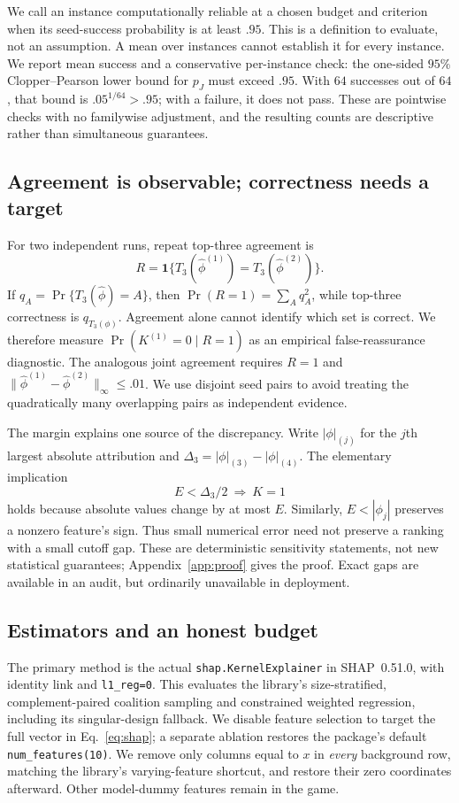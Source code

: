 We call an instance computationally reliable at a chosen budget and criterion when its seed-success probability is at least $.95$. This is a definition to evaluate, not an assumption. A mean over instances cannot establish it for every instance. We report mean success and a conservative per-instance check: the one-sided $95\%$ Clopper--Pearson lower bound for $p_J$ must exceed $.95$. With $64$ successes out of $64$, that bound is $.05^{1/64}>.95$; with a failure, it does not pass. These are pointwise checks with no familywise adjustment, and the resulting counts are descriptive rather than simultaneous guarantees.

\subsection{Agreement is observable; correctness needs a target}
For two independent runs, repeat top-three agreement is
\begin{equation}
 R=\mathbf1\{T_3(\widehat\phi^{(1)})=T_3(\widehat\phi^{(2)})\}.
\end{equation}
If $q_A=\Pr\{T_3(\widehat\phi)=A\}$, then $\Pr(R=1)=\sum_Aq_A^2$, while top-three correctness is $q_{T_3(\phi)}$. Agreement alone cannot identify which set is correct. We therefore measure $\Pr(K^{(1)}=0\mid R=1)$ as an empirical false-reassurance diagnostic. The analogous joint agreement requires $R=1$ and $\|\widehat\phi^{(1)}-\widehat\phi^{(2)}\|_\infty\leq .01$. We use disjoint seed pairs to avoid treating the quadratically many overlapping pairs as independent evidence.

The margin explains one source of the discrepancy. Write $|\phi|_{(j)}$ for the $j$th largest absolute attribution and $\Delta_3=|\phi|_{(3)}-|\phi|_{(4)}$. The elementary implication
\begin{equation}
 E<\Delta_3/2\ \Longrightarrow\ K=1
 \label{eq:margin}
\end{equation}
holds because absolute values change by at most $E$. Similarly, $E<|\phi_j|$ preserves a nonzero feature's sign. Thus small numerical error need not preserve a ranking with a small cutoff gap. These are deterministic sensitivity statements, not new statistical guarantees; Appendix~\ref{app:proof} gives the proof. Exact gaps are available in an audit, but ordinarily unavailable in deployment.

\subsection{Estimators and an honest budget}
\label{sec:budget}
The primary method is the actual \texttt{shap.KernelExplainer} in SHAP~0.51.0, with identity link and \texttt{l1\_reg=0}. This evaluates the library's size-stratified, complement-paired coalition sampling and constrained weighted regression, including its singular-design fallback. We disable feature selection to target the full vector in Eq.~\eqref{eq:shap}; a separate ablation restores the package's default \texttt{num\_features(10)}. We remove only columns equal to $x$ in \emph{every} background row, matching the library's varying-feature shortcut, and restore their zero coordinates afterward. Other model-dummy features remain in the game.

